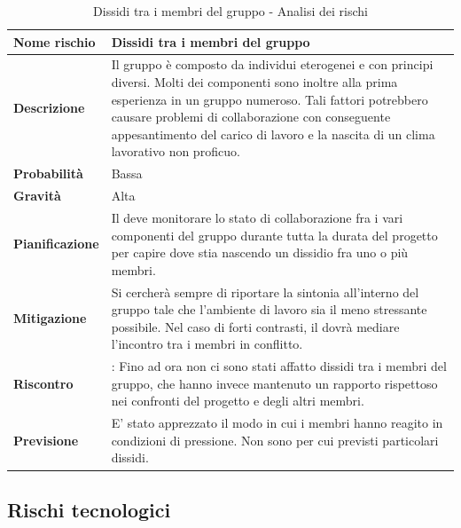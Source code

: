 \documentclass[12pt,a4paper]{article}
\begin{document}
\begin{table}[H]
	\begin{center}
		\begin{tabular}{p{} p{}}
			\toprule
			\textbf{Nome rischio} & \textbf{Dissidi tra i membri del gruppo} \\
			\midrule
			\midrule
			\textbf{Descrizione} & Il gruppo è composto da individui eterogenei e con principi diversi. Molti dei componenti sono inoltre alla prima esperienza in un gruppo numeroso. Tali fattori potrebbero causare problemi di collaborazione con conseguente appesantimento del carico di lavoro e la nascita di un clima lavorativo non proficuo. \\
			\midrule
			\textbf{Probabilità} & Bassa \\
			\midrule
			\textbf{Gravità} & Alta \\
			\midrule
			\textbf{Pianificazione} & Il \PM{} deve monitorare lo stato di collaborazione fra i vari componenti del gruppo durante tutta la durata del progetto per capire dove stia nascendo un dissidio fra uno o più membri. \\
			\midrule
			\textbf{Mitigazione} & Si cercherà sempre di riportare la sintonia all’interno del gruppo tale che l’ambiente di lavoro sia il meno stressante possibile. Nel caso di forti contrasti, il \PM{} dovrà mediare l’incontro tra i membri in conflitto. \\
			\midrule
			\textbf{Riscontro} & \textbf{\FA{}}: Fino ad ora non ci sono stati affatto dissidi tra i membri del gruppo, che hanno invece mantenuto un rapporto rispettoso nei confronti del progetto e degli altri membri. \\
            \midrule
			\textbf{Previsione} & E' stato apprezzato il modo in cui i membri hanno reagito in condizioni di pressione. Non sono per cui previsti particolari dissidi. \\
			\bottomrule
		\end{tabular}
		\caption{Dissidi tra i membri del gruppo - Analisi dei rischi}
	\end{center}
\end{table}

\subsection{Rischi tecnologici}
\end{document}
